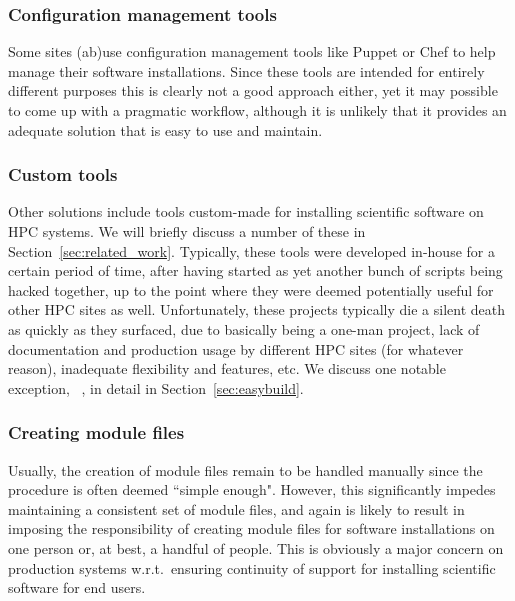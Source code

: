 \subsubsection{Configuration management tools}

Some sites (ab)use configuration management tools like Puppet or Chef to help manage
their software installations. Since these tools are intended for entirely different
purposes this is clearly not a good approach either, yet it may possible to come up
with a pragmatic workflow, although it is unlikely that it provides an adequate
solution that is easy to use and maintain.

\subsubsection{Custom tools}

Other solutions include tools custom-made for installing scientific software
on HPC systems. We will briefly discuss a number of these in
Section~\ref{sec:related_work}. Typically, these tools were developed in-house for
a certain period of time, after having started as yet another bunch of
scripts being hacked together, up to the point where they were deemed potentially
useful for other HPC sites as well. Unfortunately, these projects typically die a
silent death as quickly as they surfaced, due to basically being a one-man project,
lack of documentation and production usage by different HPC sites (for whatever
reason), inadequate flexibility and features, etc. We discuss one notable 
exception, \emph{\easybuild{}}~\cite{EasyBuildSC12}, in detail in
Section~\ref{sec:easybuild}.

\subsubsection{Creating module files}

Usually, the creation of module files remain to be handled manually since the
procedure is often deemed ``simple enough". However, this significantly impedes
maintaining a consistent set of module files, and again is likely to result in
imposing the responsibility of creating module files for software installations
on one person or, at best, a handful of people. This is obviously a major concern
on production systems w.r.t.~ensuring continuity of support for installing
scientific software for end users.

